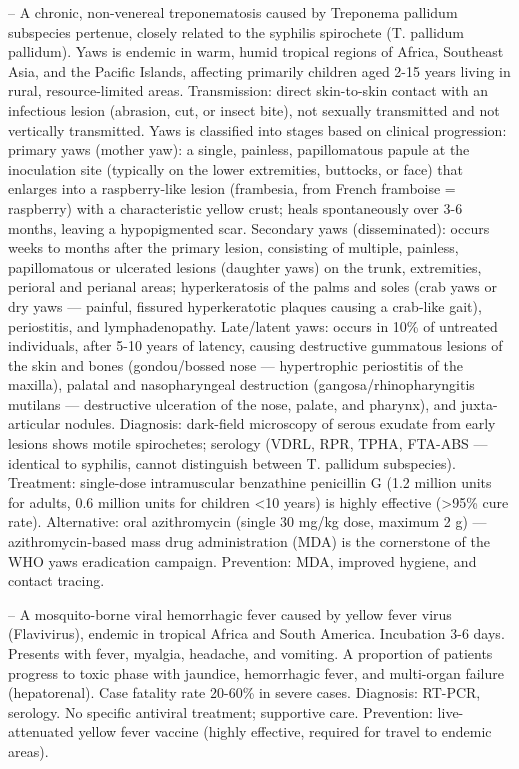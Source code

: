 -- A chronic, non-venereal treponematosis caused by Treponema pallidum subspecies pertenue, closely related to the syphilis spirochete (T. pallidum pallidum). Yaws is endemic in warm, humid tropical regions of Africa, Southeast Asia, and the Pacific Islands, affecting primarily children aged 2-15 years living in rural, resource-limited areas. Transmission: direct skin-to-skin contact with an infectious lesion (abrasion, cut, or insect bite), not sexually transmitted and not vertically transmitted. Yaws is classified into stages based on clinical progression: primary yaws (mother yaw): a single, painless, papillomatous papule at the inoculation site (typically on the lower extremities, buttocks, or face) that enlarges into a raspberry-like lesion (frambesia, from French framboise = raspberry) with a characteristic yellow crust; heals spontaneously over 3-6 months, leaving a hypopigmented scar. Secondary yaws (disseminated): occurs weeks to months after the primary lesion, consisting of multiple, painless, papillomatous or ulcerated lesions (daughter yaws) on the trunk, extremities, perioral and perianal areas; hyperkeratosis of the palms and soles (crab yaws or dry yaws — painful, fissured hyperkeratotic plaques causing a crab-like gait), periostitis, and lymphadenopathy. Late/latent yaws: occurs in 10\% of untreated individuals, after 5-10 years of latency, causing destructive gummatous lesions of the skin and bones (gondou/bossed nose — hypertrophic periostitis of the maxilla), palatal and nasopharyngeal destruction (gangosa/rhinopharyngitis mutilans — destructive ulceration of the nose, palate, and pharynx), and juxta-articular nodules. Diagnosis: dark-field microscopy of serous exudate from early lesions shows motile spirochetes; serology (VDRL, RPR, TPHA, FTA-ABS — identical to syphilis, cannot distinguish between T. pallidum subspecies). Treatment: single-dose intramuscular benzathine penicillin G (1.2 million units for adults, 0.6 million units for children <10 years) is highly effective (>95\% cure rate). Alternative: oral azithromycin (single 30 mg/kg dose, maximum 2 g) — azithromycin-based mass drug administration (MDA) is the cornerstone of the WHO yaws eradication campaign. Prevention: MDA, improved hygiene, and contact tracing.

-- A mosquito-borne viral hemorrhagic fever caused by yellow fever virus (Flavivirus), endemic in tropical Africa and South America. Incubation 3-6 days. Presents with fever, myalgia, headache, and vomiting. A proportion of patients progress to toxic phase with jaundice, hemorrhagic fever, and multi-organ failure (hepatorenal). Case fatality rate 20-60\% in severe cases. Diagnosis: RT-PCR, serology. No specific antiviral treatment; supportive care. Prevention: live-attenuated yellow fever vaccine (highly effective, required for travel to endemic areas).

